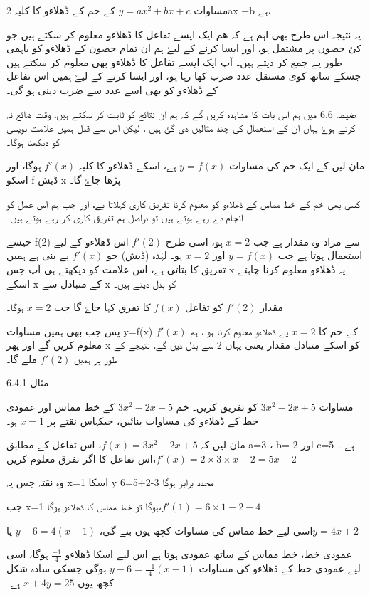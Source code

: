 مساوات  \( y=ax^{2}+bx+c\)   کے خم کے  ڈھلاءو کا کلیہ       2ax +b    ہے،


یہ نتیجہ اس طرح بھی اہم ہے کہ ھم ایک ایسے تفاعل کا ڈھلاءو معلوم کر سکتے ہیں جو کئ حصوں پر مشتمل ہو، اور ایسا کرنے کے لیۓ ہم ان تمام حصون کے ڈھلاءو کو باہمی طور پے جمع کر دیتے ہیں۔
آپ ایک ایسے تفاعل کا ڈھلاءو بھی  معلوم کر سکتے ہیں جسکے ساتھ کوی مستقل عدد ضرب کھا رہا ہو، اور ایسا کرنے کے لیۓ ہمیں اس تفاعل کے ڈھلاءو کو بھی اسے عدد سے ضرب دینی ہو گی۔

ضیمہ  6.6 میں ہم اس بات کا مشاہدہ کریں گے کہ ہم ان نتائج کو ثابت کر سکتے ہیں، وقت ضائع نہ کرتے ہوۓ یہاں ان کے استعمال کی چند مثالیں دی گئ ہیں ، لیکن اس سے قبل ہمیں علامت نویسی کو دیکھنا ہوگا۔


مان لیں کے ایک خم کی مساوات \(y=f(x) \)  ہے، اسکے ڈھلاءو کا کلیہ \( f\prime (x)\) ہوگا، اور اسکو  f    ڈیش  x پڑھا جاۓ گا۔

کسی بھی خم کے خط مماس کے ڈھلاءو کو معلوم کرنا تفریق کاری کہلاتا یے، اور جب ہم اس عمل کو انجام دے رہے ہوتے ہیں تو دراصل ہم تفریق کاری کر رہے ہوتے ہیں۔


جیسے f(2)  سے مراد وہ مقدار ہے جب \( x=2\) ہو، اسی طرح  \( f\prime (2)\) اس ڈھلاءو کے لیے استعمال ہوتا ہے جب \( y=f(x)\) اور \(x=2\) ہو۔ لہٰذہ (ڈیش) جو \( f \prime (x)\) پے بنی ہے ہمیں تفریق کا بتاتی ہے، اس علامت کو دیکھتے ہی آپ جس  x پہ ڈھلاءو معلوم کرنا چاہتے اسکے x کے متبادل سے x کو بدل دیتے ہیں۔

مقدار \( f\prime (2)\) کو تفاعل \( f(x)\) کا تفرق کہا جاۓ گا جب \(x=2\) ہوگا۔

  
پس جب بھی ہمیں مساوات   y=f(x) کے خم کا   \(x=2\) پے ڈھلاءو  معلوم کرنا ہو ، ہم \(f\prime (x)\) معلوم کریں گے اور پھر x کو اسکے متبادل مقدار یعنی یہاں 2 سے بدل دیں گے، نتیجے کے طور پر ہمیں \( f\prime (2)\) ملے گا۔



مثال 6.4.1

مساوات \( 3x^{2}-2x+5\) کو تفریق کریں۔
خم \( 3x^{2}-2x+5\) کے خط مماس اور عمودی خط کے ڈھلاءو کی مساوات بنائیں، جبکہاس نقتے پر \(x=1\) ہو۔

مان لیں کہ \(f(x)=3x^{2}-2x+5\)، اس تفاعل کے مطابق    a=3         ،      b=-2        اور     c=5
ہے ۔ اس تفاعل کا اگر تفرق معلوم کریں،\( f\prime(x) =2\times3\times x-2 = 5x-2\)

وہ نقتہ جس پہ x=1 اسکا  y محدد برابر ہوگا   3-2+5=6

جب x=1 ہوگا تو خط مماس کا ڈھلاءو ہوگا،\(f\prime (1)=6\times 1-2-4\)

اسی لیے خط مماس کی مساوات کچھ یوں بنے گی،         \( y-6=4(x-1)\)    یا\(y=4x+2\)

عمودی خط، خط مماس کے ساتھ عمودی ہوتا ہے اس لیے اسکا ڈھلاءو   \( \frac{-1}{4}\)  ہوگا، اسی لیے عمودی خط کے ڈھلاءو کی مساوات      \(y-6=\frac{-1}{4}(x-1)\)  ہوگی جسکی سادہ شکل کچھ یوں \(x+4y=25\) ہے۔


